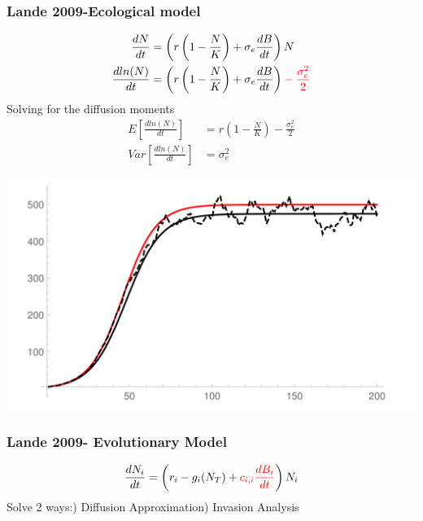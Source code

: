 \documentclass{beamer}
\begin{document}
\begin{frame}
\frametitle{Lande 2009-Ecological model}
\begin{minipage}{0.45\textwidth}
\scriptsize
\begin{equation*}
\begin{aligned}
 \frac{dN}{dt}&=\left(r\left(1-\frac{N}{K}\right)+\sigma_e\frac{dB}{dt}\right)N\\
\frac{dln(N)}{dt}&=\left(r\left(1-\frac{N}{K}\right)+\sigma_e\frac{dB}{dt}\right)\begingroup\color{red}-\frac{\sigma_e^2}{2}\endgroup\\
\end{aligned}
\end{equation*}
Solving for the diffusion moments
\begin{equation*}
\begin{aligned}
E[\frac{dln(N)}{dt}]&=r\left(1-\frac{N}{K}\right)-\frac{\sigma_e^2}{2}\\
Var[\frac{dln(N)}{dt}]&=\sigma_e^2
\end{aligned}
\end{equation*}
\normalsize
\end{minipage}
\begin{minipage}{0.45\textwidth}
\includegraphics[width=1.2\columnwidth]{Itoprocess.pdf}
\end{minipage}%
\end{frame}

\begin{frame}
\frametitle{Lande 2009- Evolutionary Model}
\begin{equation*}
\frac{dN_i}{dt}=\left(r_i-g_i(N_T)+\begingroup\color{red}c_{i,i}\frac{dB_i}{dt}\endgroup\right)N_i
\end{equation*}
Solve 2 ways:) Diffusion Approximation) Invasion Analysis
\end{frame}
\end{document}
